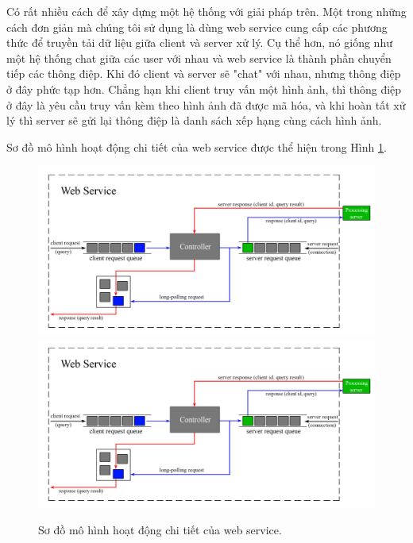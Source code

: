 {Có rất nhiều cách để xây dựng một hệ thống với giải pháp trên. Một trong những cách đơn giản mà chúng tôi sử dụng là dùng web service cung cấp các phương thức để truyền tải dữ liệu giữa client và server xử lý. Cụ thể hơn, nó giống như một hệ thống chat giữa các user với nhau và web service là thành phần chuyển tiếp các thông điệp. Khi đó client và server sẽ "chat" với nhau, nhưng thông điệp ở đây phức tạp hơn. Chẳng hạn khi client truy vấn một hình ảnh, thì thông điệp ở đây là yêu cầu truy vấn kèm theo hình ảnh đã được mã hóa, và khi hoàn tất xử lý thì server sẽ gửi lại thông điệp là danh sách xếp hạng cùng cách hình ảnh.

Sơ đồ mô hình hoạt động chi tiết của web service được thể hiện trong Hình \ref{FigWS}.

\begin{figure}[!htbp]
  \begin{center}
    \leavevmode
    \ifpdf
      \includegraphics[scale=0.17]{ws_model}
    \else
      \includegraphics[scale=0.17]{ws_model}
    \fi
    \caption[Sơ đồ mô hình hoạt động chi tiết của web service]{Sơ đồ mô hình hoạt động chi tiết của web service.}
    \label{FigWS}
  \end{center}
\end{figure}

}
